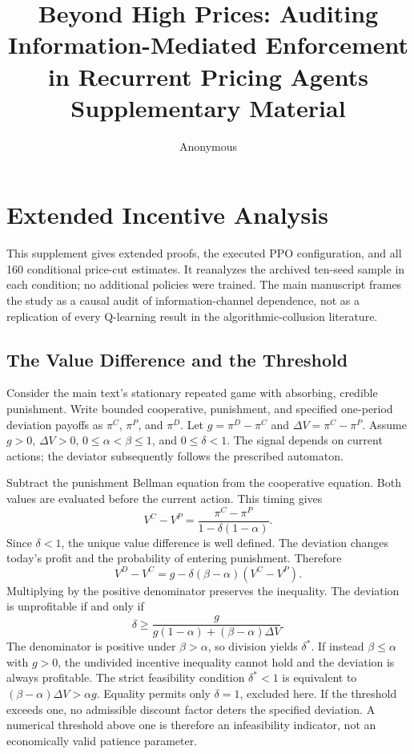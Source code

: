 \documentclass{article}
\title{Beyond High Prices: Auditing Information-Mediated Enforcement in Recurrent Pricing Agents \\ \large Supplementary Material}
\author{Anonymous}
\begin{document}
\maketitle

\appendix

\section{Extended Incentive Analysis}

This supplement gives extended proofs, the executed PPO configuration, and all 160 conditional price-cut estimates. It reanalyzes the archived ten-seed sample in each condition; no additional policies were trained. The main manuscript frames the study as a causal audit of information-channel dependence, not as a replication of every Q-learning result in the algorithmic-collusion literature.

\subsection{The Value Difference and the Threshold}

Consider the main text's stationary repeated game with absorbing, credible punishment. Write bounded cooperative, punishment, and specified one-period deviation payoffs as $\pi^C$, $\pi^P$, and $\pi^D$. Let $g = \pi^D - \pi^C$ and $\Delta V = \pi^C - \pi^P$. Assume $g > 0$, $\Delta V > 0$, $0\leq\alpha<\beta\leq1$, and $0\leq\delta<1$. The signal depends on current actions; the deviator subsequently follows the prescribed automaton.

Subtract the punishment Bellman equation from the cooperative equation. Both values are evaluated before the current action. This timing gives
\[
V^C - V^P = \frac{\pi^C - \pi^P}{1 - \delta(1 - \alpha)}.
\]
Since $\delta < 1$, the unique value difference is well defined. The deviation changes today's profit and the probability of entering punishment. Therefore
\[
V^D - V^C = g - \delta(\beta - \alpha)(V^C - V^P).
\]
Multiplying by the positive denominator preserves the inequality. The deviation is unprofitable if and only if
\[
\delta \geq \frac{g}{g(1 - \alpha) + (\beta - \alpha)\Delta V}.
\]
The denominator is positive under $\beta>\alpha$, so division yields $\delta^*$. If instead $\beta\leq\alpha$ with $g>0$, the undivided incentive inequality cannot hold and the deviation is always profitable. The strict feasibility condition $\delta^* < 1$ is equivalent to $(\beta - \alpha)\Delta V > \alpha g$. Equality permits only $\delta = 1$, excluded here. If the threshold exceeds one, no admissible discount factor deters the specified deviation. A numerical threshold above one is therefore an infeasibility indicator, not an economically valid patience parameter.
\end{document}
